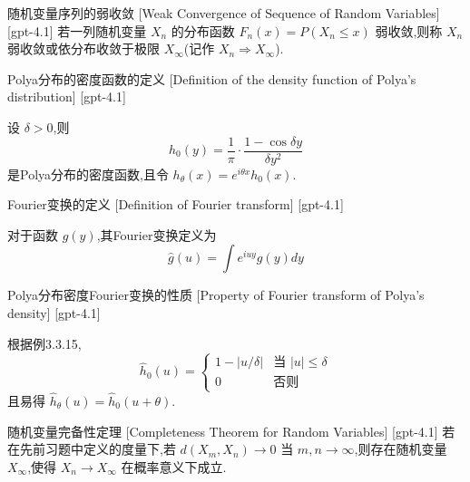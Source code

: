 \documentclass[UTF8]{ctexart}
\begin{document}
    
    
    \begin{dfn}
        {随机变量序列的弱收敛}
        [Weak Convergence of Sequence of Random Variables]
        [gpt-4.1]
        若一列随机变量 $X_n$ 的分布函数 $F_n(x) = P(X_n \leq x)$ 弱收敛,则称 $X_n$ 弱收敛或依分布收敛于极限 $X_\infty$(记作 $X_n \Rightarrow X_\infty$).
    \end{dfn}
    
    
    
    \begin{dfn}
        {Polya分布的密度函数的定义}
        [Definition of the density function of Polya's distribution]
        [gpt-4.1]
        
设 $\delta > 0$,则
\[
h_{0}(y) = \frac{1}{\pi} \cdot \frac{1 - \cos \delta y}{\delta y^{2}}
\]
是Polya分布的密度函数,且令 $h_{\theta}(x) = e^{i\theta x} h_{0}(x)$.

    \end{dfn}
    
    
    
    \begin{dfn}
        {Fourier变换的定义}
        [Definition of Fourier transform]
        [gpt-4.1]
        
对于函数 $g(y)$,其Fourier变换定义为
\[
\hat{g}(u) = \int e^{iu y} g(y) dy
\]

    \end{dfn}
    
    
    
    \begin{ppt}
        {Polya分布密度Fourier变换的性质}
        [Property of Fourier transform of Polya's density]
        [gpt-4.1]
        
根据例3.3.15,
\[
\hat{h}_{0}(u) = 
\begin{cases}
1 - |u/\delta| & \text{当 } |u| \leq \delta \\
0 & \text{否则}
\end{cases}
\]
且易得 $\hat{h}_{\theta}(u) = \hat{h}_{0}(u+\theta)$.

    \end{ppt}
    
    
    
    \begin{thm}
        {随机变量完备性定理}
        [Completeness Theorem for Random Variables]
        [gpt-4.1]
        若在先前习题中定义的度量下,若 $d(X_m, X_n) \to 0$ 当 $m, n \to \infty$,则存在随机变量 $X_\infty$,使得 $X_n \to X_\infty$ 在概率意义下成立.
    \end{thm}
    
\end{document}
